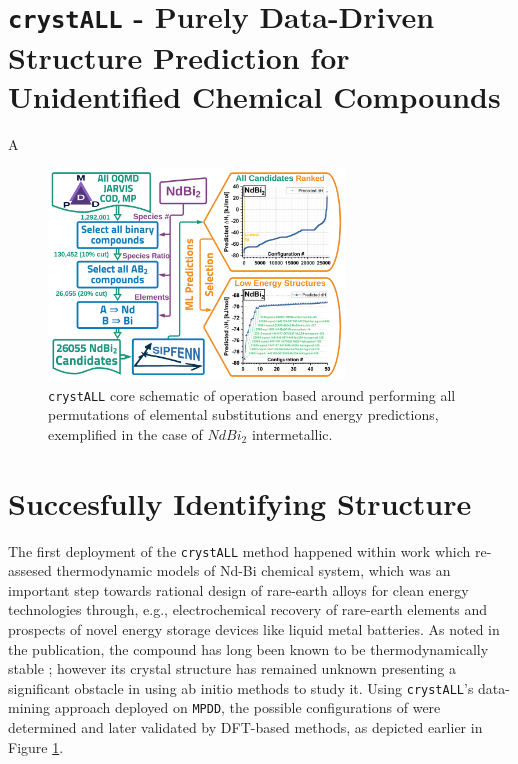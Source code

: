 \section{\texttt{crystALL} - Purely Data-Driven Structure Prediction for Unidentified Chemical Compounds} \label{crystall:sec:crystall}

A

\begin{figure}[H]
    \centering
    \includegraphics[width=0.7\textwidth]{crystall/NdBi2_GraphicalAbstract_V4.png}
    \caption{\texttt{crystALL} core schematic of operation based around performing all permutations of elemental substitutions and energy predictions, exemplified in the case of $NdBi_2$ intermetallic.}
    \label{crystall:fig:crystallcompound}
\end{figure}



\section{Succesfully Identifying  Structure} \label{crystall:ndbi2}

The first deployment of the \texttt{crystALL} method happened within \citet{Im2022ThermodynamicModeling} work which re-assesed thermodynamic models of Nd-Bi chemical system, which was an important step towards rational design of rare-earth alloys for clean energy technologies through, e.g., electrochemical recovery of rare-earth elements and prospects of novel energy storage devices like liquid metal batteries. As noted in the publication, the  compound has long been known to be thermodynamically stable \cite{Yoshihara1975Rare-earthBismuthides}; however its crystal structure has remained unknown presenting a significant obstacle in using ab initio methods to study it. Using \texttt{crystALL}'s data-mining approach deployed on \texttt{MPDD}, the possible configurations of  were determined and later validated by DFT-based methods, as depicted earlier in Figure \ref{crystall:fig:crystallcompound}.

